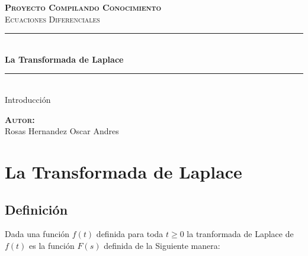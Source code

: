 \documentclass[12pt]{report}                                    %
\author{Oscar Andrés Rosas}                                     %
\begin{document}
\begin{titlepage}

	\center
	\textbf{\textsc{\Large Proyecto Compilando Conocimiento}}\\[1.0cm] 
	\textsc{\Large Ecuaciones Diferenciales}\\[1.0cm] 

	\rule{\linewidth}{0.5mm} \\[1.0cm]
		{ \huge \bfseries La Transformada de Laplace}\\[1.0cm] 
	\rule{\linewidth}{0.5mm} \\[2.0cm]
	
	{\LARGE Introducción}\\[7cm] 
	
	\begin{center} \large
	\textbf{\textsc{Autor:}}\\
	Rosas Hernandez Oscar Andres
	\end{center}

	\vfill

\end{titlepage}

\tableofcontents{}
\label{sec:Index}

\clearpage

\chapter{La Transformada de Laplace}
    \clearpage

    \section{Definición}
        Dada una función $f(t)$ definida para toda $t \geq 0$ la tranformada de
        Laplace de $f(t)$ es la función $F(s)$ definida de la Siguiente manera:
\end{document}
